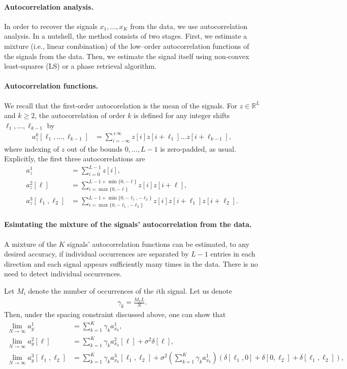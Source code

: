 \documentclass[english,11pt]{article}
\theoremstyle{plain}
\theoremstyle{definition}
\theoremstyle{remark}
\theoremstyle{plain}
\newcommand{\RL}{\mathbb{R}^L}
\begin{document}
\paragraph{Autocorrelation analysis.}
In order to recover the signals $x_1,\dots,x_K$ from the data, we use autocorrelation analysis.
In a nutshell, the method consists of two stages. First, we estimate a mixture (i.e., linear combination) of the low--order autocorrelation functions of the signals from the data. Then, we estimate the signal itself using non-convex least-squares (LS) or a phase retrieval algorithm. 

\paragraph{Autocorrelation functions.}
We recall that the first-order autocorelation is the mean of the signals. For  
$z\in\RL$ and $k\geq 2$, the autocorrelation of order $k$ is defined for any integer shifts $\ell_1, \ldots, \ell_{k-1}$ by
\begin{align}
a_z^k[\ell_1,\ldots,\ell_{k-1}]  & = \sum_{i=-\infty}^{+\infty} z[i]z[i+\ell_1]\ldots z[i+\ell_{k-1}],
\label{eq:ac_general}
\end{align}
where indexing of $z$ out of the bounds $0, \ldots, L-1$ is zero-padded, as usual.
Explicitly, the first three autocorrelations are
\begin{align} 
a_z^1 & = \sum_{i=0}^{L-1} z[i], \nonumber\\
a_z^2[\ell] & = \sum_{i = \max\{0, -\ell\}}^{L-1 + \min\{0, -\ell\}} z[i]z[i+\ell], \nonumber\\
a_z^3[\ell_1,\ell_2] & = \sum_{i = \max\{0, -\ell_1, -\ell_2\}}^{L-1 + \min\{0, -\ell_1, -\ell_2\}} z[i]z[i+\ell_1]z[i+\ell_2]. \label{eq:ac_special}
\end{align}

\paragraph{Esimtating the mixture of the signals' autocorrelation from the data.}
A mixture of the $K$ signals' autocorrelation functions can be estimated, to any desired accuracy, if individual occurrences are separated by  $L-1$ entries in each direction and each signal appears sufficiently many times in the data. There is no need to detect individual occurrences.

Let $M_i$ denote the number of occurrences of the $i$th signal. 
Let us denote
\begin{align}
\gamma_k = \frac{M_k L}{N}.
\end{align}
Then, under the spacing constraint discussed above, one can show that
\begin{align} 
\lim_{N\to\infty} a_y^1 & = \sum_{k=1}^K\gamma_k a_{x_k}^1, \nonumber\\
\lim_{N\to\infty} a_y^2[\ell] & = \sum_{k=1}^K\gamma_k a_{x_k}^2[\ell] +\sigma^2\delta[\ell],  \label{eq:data_ac}\\
\lim_{N\to\infty} a_y^3[\ell_1,\ell_2] & = \sum_{k=1}^K\gamma_k a_{x_k}^3[\ell_1,\ell_2] + \sigma^2\left(\sum_{k=1}^K\gamma_k a_{x_k}^1\right)(\delta[\ell_1,0]+\delta[0,\ell_2]+\delta[\ell_1,\ell_2]), \nonumber
\end{align}
\end{document}
